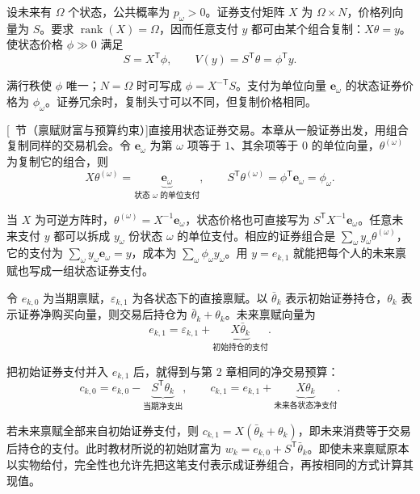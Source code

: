 \begin{tcolorbox}[knowledge,title=完全性与状态价格]
设未来有 $\Omega$ 个状态，公共概率为 $p_\omega>0$。证券支付矩阵 $X$ 为 $\Omega\times N$，价格列向量为 $S$。要求 $\operatorname{rank}(X)=\Omega$，因而任意支付 $y$ 都可由某个组合复制：$X\theta=y$。使状态价格 $\phi\gg0$ 满足
\[
 S=X^{\mathsf T}\phi,\qquad V(y)=S^{\mathsf T}\theta=\phi^{\mathsf T}y.
\]

满行秩使 $\phi$ 唯一；$N=\Omega$ 时可写成 $\phi=X^{-\mathsf T}S$。支付为单位向量 $\mathbf e_\omega$ 的状态证券价格为 $\phi_\omega$。证券冗余时，复制头寸可以不同，但复制价格相同。
\end{tcolorbox}

[~节（禀赋财富与预算约束）]直接用状态证券交易。本章从一般证券出发，用组合复制同样的交易机会。令 $\mathbf e_\omega$ 为第 $\omega$ 项等于 $1$、其余项等于 $0$ 的单位向量，$\theta^{(\omega)}$ 为复制它的组合，则
\[
 X\theta^{(\omega)}
 =\underbrace{\mathbf e_\omega}_{\text{状态 }\omega\text{ 的单位支付}},
 \qquad
 S^{\mathsf T}\theta^{(\omega)}
 =\phi^{\mathsf T}\mathbf e_\omega=\phi_\omega.
\]

当 $X$ 为可逆方阵时，$\theta^{(\omega)}=X^{-1}\mathbf e_\omega$，状态价格也可直接写为 $S^{\mathsf T}X^{-1}\mathbf e_\omega$。任意未来支付 $y$ 都可以拆成 $y_\omega$ 份状态 $\omega$ 的单位支付。相应的证券组合是 $\sum_\omega y_\omega\theta^{(\omega)}$，它的支付为 $\sum_\omega y_\omega\mathbf e_\omega=y$，成本为 $\sum_\omega\phi_\omega y_\omega$。用 $y=e_{k,1}$ 就能把每个人的未来禀赋也写成一组状态证券支付。

令 $e_{k,0}$ 为当期禀赋，$\varepsilon_{k,1}$ 为各状态下的直接禀赋。以 $\bar\theta_k$ 表示初始证券持仓，$\theta_k$ 表示证券净购买向量，则交易后持仓为 $\bar\theta_k+\theta_k$。未来禀赋向量为
\[
 e_{k,1}=\varepsilon_{k,1}+\underbrace{X\bar\theta_k}_{\text{初始持仓的支付}}.
\]

把初始证券支付并入 $e_{k,1}$ 后，就得到与第 2 章相同的净交易预算：
\[
 c_{k,0}=e_{k,0}-\underbrace{S^{\mathsf T}\theta_k}_{\text{当期净支出}},
 \qquad
 c_{k,1}=e_{k,1}+\underbrace{X\theta_k}_{\text{未来各状态净支付}}.
\]

若未来禀赋全部来自初始证券支付，则 $c_{k,1}=X(\bar\theta_k+\theta_k)$，即未来消费等于交易后持仓的支付。此时教材所说的初始财富为 $w_k=e_{k,0}+S^{\mathsf T}\bar\theta_k$。即使未来禀赋原本以实物给付，完全性也允许先把这笔支付表示成证券组合，再按相同的方式计算其现值。

